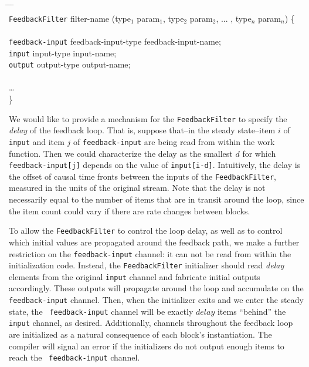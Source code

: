 \documentclass[draft]{article}
\begin{document}
\begin{tabbing}
\hspace{0.2in} \= \hspace{0.2in} \= \hspace{0.2in} \= \hspace{0.2in} \= \\

{\tt FeedbackFilter} filter-name (type$_1$ param$_1$, type$_2$ param$_2$,
... , type$_n$ param$_n$) \{ \\ \\

\> {\tt feedback-input} feedback-input-type feedback-input-name; \\
\> {\tt input} input-type input-name; \\
\> {\tt output} output-type output-name; \\ \\

\> \dots \\
\}
\end{tabbing}

We would like to provide a mechanism for the {\tt FeedbackFilter} to
specify the {\it delay} of the feedback loop.  That is, suppose
that--in the steady state--item $i$ of {\tt input} and item $j$ of
{\tt feedback-input} are being read from within the work function.
Then we could
characterize the delay as the smallest $d$ for which {\tt
feedback-input[j]} depends on the value of {\tt input[i-d]}.
Intuitively, the delay is the offset of causal time fronts between the
inputs of the {\tt FeedbackFilter}, measured in the units of the
original stream.  Note that the delay is not necessarily equal to the
number of items that are in transit around the loop, since the item
count could vary if there are rate changes between blocks.

To allow the {\tt FeedbackFilter} to control the loop delay, as well
as to control which initial values are propagated around the feedback
path, we make a further restriction on the {\tt feedback-input}
channel: it can not be read from within the initialization code.
Instead, the {\tt FeedbackFilter} initializer should read {\it delay}
elements from the original {\tt input} channel and fabricate initial
outputs accordingly.  These outputs will propagate around the loop and
accumulate on the {\tt feedback-input} channel.  Then, when the
initializer exits and we enter the steady state, the {\tt
feedback-input} channel will be exactly $delay$ items ``behind'' the
{\tt input} channel, as desired.  Additionally, channels throughout
the feedback loop are initialized as a natural consequence of each
block's instantiation.  The compiler will signal an error if the
initializers do not output enough items to reach the {\tt
feedback-input} channel.
\end{document}
